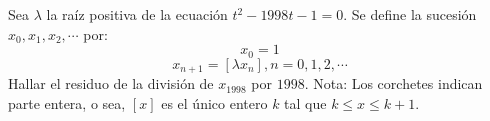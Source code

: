 Sea $\lambda$ la raíz positiva de la ecuación $t^2 - 1998t - 1 = 0$. Se define la sucesión $x_0, x_1, x_2, \cdots$ por:
\[ x_0 = 1 \]
\[ x_{n+1} = [\lambda x_n], n=0,1,2,\cdots \]
Hallar el residuo de la división de $x_{1998}$ por $1998$. \newline 
Nota: Los corchetes indican parte entera, o sea, $[x]$ es el único entero $k$ tal que $k \leq x \leq k+1$.
